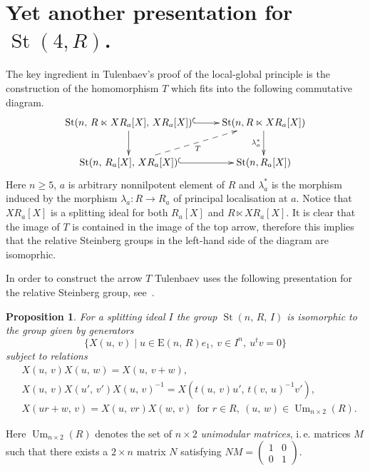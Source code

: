 \documentclass[11pt]{amsart}
\theoremstyle{plain} \declaretheorem[name=Theorem, Refname={Theorem,Theorems}]{tm} \Crefname{tm}{Theorem}{Theorems}
\numberwithin{equation}{section}
\newtheorem{prop}[lm]{Proposition} \Crefname{prop}{Proposition}{Propositions}
\theoremstyle{definition} \newtheorem{df}[lm]{Definition} \Crefname{df}{Definition}{Definitions}
\theoremstyle{remark} \newtheorem{rk}[lm]{Remark} \Crefname{rk}{Remark}{Remarks}
\newcommand{\E}{{\mathrm{E}}}
\newcommand{\Um}{\mathop{\mathrm{Um}}\nolimits}
\newcommand{\St}{\mathop{\mathrm{St}}\nolimits}
\newcommand{\inv}{^{-1}}
\begin{document}
\section{Yet another presentation for $\St(4, R)$.} \label{sec:yap}
The key ingredient in Tulenbaev's proof of the local-global principle is the construction of the homomorphism $T$ which fits into the following commutative diagram.
$$\xymatrix{\St(n,\,R\ltimes XR_a[X],\,XR_a[X]) \ar@{^{(}->}[r] \ar[d] & \St(n, R \ltimes XR_a[X]) \ar[d]_-{\lambda_a^*} \\
             \St(n,\,R_a[X],\,XR_a[X]) \ar@{-->}[ru]_-{T} \ar@{^{(}->}[r] & \St(n, R_a[X])}$$
Here $n\geq5$, $a$ is arbitrary nonnilpotent element of $R$ and $\lambda_a^*$ is the morphism induced by the morphism $\lambda_a\colon R \to R_a$ of principal localisation at $a$.
Notice that $XR_a[X]$ is a splitting ideal for both $R_a[X]$ and $R \ltimes XR_a[X]$.
It is clear that the image of $T$ is contained in the image of the top arrow, therefore this implies that the relative Steinberg groups in the left-hand side of the diagram are isomoprhic.


In order to construct the arrow $T$ Tulenbaev uses the following presentation for the relative Steinberg group, see~\cite[Proposition~1.6]{Tul}. 
\begin{prop}\label{prop:TulPres}
For a splitting ideal $I$ the group $\St(n,\,R,\,I)$ is isomorphic to the group given by generators
$$\{X(u,\,v)\mid u\in\E(n,\,R)e_1,\ v\in I^n,\ u^tv=0\}$$ subject to relations
\setcounter{equation}{0}
\renewcommand{\theequation}{T\arabic{equation}}
\begin{align}
&X(u,\,v)X(u,\,w)=X(u,\,v+w), \label{add2}\\
&X(u,\,v)X(u',\,v')X(u,\,v)\inv=X(t(u,\,v)u',\,t(v,\,u)\inv v'), \label{conj2}  \\
&X(ur+w,\,v)=X(u,\,vr)X(w,\,v)\,\text{ for }r\in R,\ (u,\,w)\in\Um_{n\times2}(R) \label{add3}.
\end{align}
\end{prop}
Here $\Um_{n\times2}(R)$ denotes the set of $n\times2$ \emph{unimodular matrices}, i.\,e. matrices $M$ such that there exists a $2\times n$ matrix $N$ satisfying $NM=\begin{pmatrix}1&0\\0&1\end{pmatrix}$.
\end{document}
